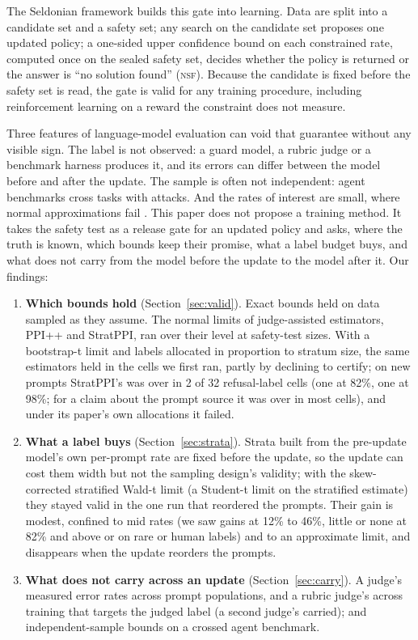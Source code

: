 \documentclass[letterpaper]{article} %
\newcommand{\SWT}{stratified Wald-t limit}
\newcommand{\NSF}{\textsc{nsf}}
\begin{document}
The Seldonian framework \citep{thomas2019preventing} builds this gate into learning. Data are split into a candidate
set and a safety set; any search on the candidate set proposes one updated policy; a one-sided upper confidence bound
on each constrained rate, computed once on the sealed safety set, decides whether the policy is returned or the answer
is ``no solution found'' (\NSF{}). Because the candidate is fixed before the safety set is read, the gate is valid for
any training procedure, including reinforcement learning on a reward the constraint does not measure.

Three features of language-model evaluation can void that guarantee without any visible sign. The label is not
observed: a guard model, a rubric judge or a benchmark harness produces it, and its errors can differ between the
model before and after the update. The sample is often not independent: agent benchmarks cross tasks with attacks.
And the rates of interest are small, where normal approximations fail \citep{bowyer2025clt}. This paper does not propose
a training method. It takes the safety test as a release gate for an updated policy and asks, where the truth is known,
which bounds keep their promise, what a label budget buys, and what does not carry from the model before the update to
the model after it. Our findings:
\begin{enumerate}
\item \textbf{Which bounds hold} (Section~\ref{sec:valid}). Exact bounds held on data sampled as they assume. The
  normal limits of judge-assisted estimators, PPI++ and StratPPI, ran over their level at safety-test sizes. With a
  bootstrap-t limit and labels allocated in proportion to stratum size, the same estimators held in the cells we first
  ran, partly by declining to certify; on new prompts StratPPI's was over in 2 of 32 refusal-label cells (one at 82\%, one
  at 98\%; for a claim about the prompt source it was over in most cells), and under its paper's own
  allocations it failed.
\item \textbf{What a label buys} (Section~\ref{sec:strata}). Strata built from the pre-update model's own per-prompt
  rate are fixed before the update, so the update can cost them width but not the sampling design's validity; with the
  skew-corrected \SWT{} (a Student-t limit on the stratified estimate) they stayed valid in the one run that reordered the prompts. Their gain is modest, confined to mid
  rates (we saw gains at 12\% to 46\%, little or none at 82\% and above or on rare or human labels) and to an approximate limit, and disappears when the update reorders the prompts.
\item \textbf{What does not carry across an update} (Section~\ref{sec:carry}). A judge's measured error rates across
  prompt populations, and a rubric judge's across training that targets the judged label (a second judge's carried);
  and independent-sample bounds on a crossed agent benchmark.
\end{enumerate}
\end{document}
